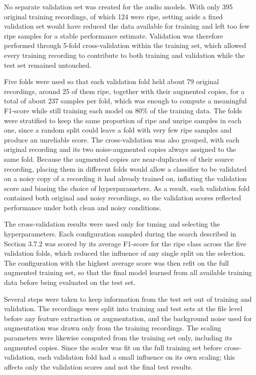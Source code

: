 \begin{thesisprose}
No separate validation set was created for the audio models. With only 395 original training recordings, of which 124 were ripe, setting aside a fixed validation set would have reduced the data available for training and left too few ripe samples for a stable performance estimate. Validation was therefore performed through 5-fold cross-validation within the training set, which allowed every training recording to contribute to both training and validation while the test set remained untouched.

Five folds were used so that each validation fold held about 79 original recordings, around 25 of them ripe, together with their augmented copies, for a total of about 237 samples per fold, which was enough to compute a meaningful F1-score while still training each model on 80\% of the training data. The folds were stratified to keep the same proportion of ripe and unripe samples in each one, since a random split could leave a fold with very few ripe samples and produce an unreliable score. The cross-validation was also grouped, with each original recording and its two noise-augmented copies always assigned to the same fold. Because the augmented copies are near-duplicates of their source recording, placing them in different folds would allow a classifier to be validated on a noisy copy of a recording it had already trained on, inflating the validation score and biasing the choice of hyperparameters. As a result, each validation fold contained both original and noisy recordings, so the validation scores reflected performance under both clean and noisy conditions.

The cross-validation results were used only for tuning and selecting the hyperparameters. Each configuration sampled during the search described in Section 3.7.2 was scored by its average F1-score for the ripe class across the five validation folds, which reduced the influence of any single split on the selection. The configuration with the highest average score was then refit on the full augmented training set, so that the final model learned from all available training data before being evaluated on the test set.

Several steps were taken to keep information from the test set out of training and validation. The recordings were split into training and test sets at the file level before any feature extraction or augmentation, and the background noise used for augmentation was drawn only from the training recordings. The scaling parameters were likewise computed from the training set only, including its augmented copies. Since the scaler was fit on the full training set before cross-validation, each validation fold had a small influence on its own scaling; this affects only the validation scores and not the final test results.


\end{thesisprose}
